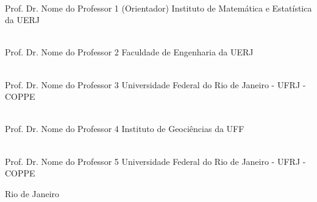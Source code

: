 \begin{flushright}
\parbox{12cm}{

\singlespacing

\hrulefill \\

\vspace{-.4cm}
Prof. Dr. Nome do Professor 1 (Orientador)
\newline
Instituto de Matemática e Estatística da UERJ
\vspace{.7cm}

\hrulefill \\

\vspace{-.4cm}
Prof. Dr. Nome do Professor 2
\newline
Faculdade de Engenharia da UERJ
\vspace{.7cm}

\hrulefill \\

\vspace{-.4cm}
Prof. Dr. Nome do Professor 3
\newline
Universidade Federal do Rio de Janeiro - UFRJ - COPPE
\vspace{.7cm}

\hrulefill \\

\vspace{-.4cm}
Prof. Dr. Nome do Professor 4
\newline
Instituto de Geociências da UFF
\vspace{.7cm}

\hrulefill \\

\vspace{-.4cm}
Prof. Dr. Nome do Professor 5
\newline
Universidade Federal do Rio de Janeiro - UFRJ - COPPE
\vspace{.7cm}

}
\end{flushright}
\vfill

\begin{center}
Rio de Janeiro
\end{center}
